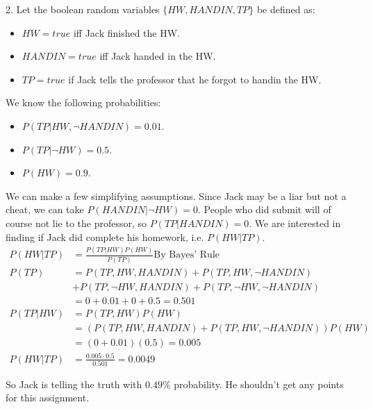 \documentclass[11pt]{article}
\begin{document}
2. Let the boolean random variables $\{HW,HANDIN,TP\}$ be defined as:
		\begin{itemize}
			\item $HW = true$ iff Jack finished the HW.
			\item $HANDIN = true$ iff Jack handed in the HW.
			\item $TP = true$ if Jack tells the professor that he forgot to handin the HW.
		\end{itemize}
	We know the following probabilities:
	\begin{itemize}
		\item $P(TP|HW,\lnot HANDIN) = 0.01$.
		\item $P(TP|\lnot HW) = 0.5$.
		\item $P(HW) = 0.9$.
	\end{itemize}
	We can make a few simplifying assumptions. Since Jack may be a liar but not a cheat,
	we can take $P(HANDIN|\lnot HW) = 0$. People who did submit will of course not
	lie to the professor, so $P(TP|HANDIN) = 0$. We are interested in finding
	if Jack did complete his homework, i.e. $P(HW|TP)$.
	\begin{align*}
		P(HW|TP) &= \frac{P(TP|HW)P(HW)}{P(TP)} \text{By Bayes' Rule} \\
		P(TP) 	 &= P(TP,HW,HANDIN) + P(TP,HW,\lnot HANDIN) \\
						 &	+ P(TP,\lnot HW,HANDIN) + P(TP,\lnot HW,\lnot HANDIN) \\
						 &= 0 + 0.01 + 0 + 0.5 = 0.501 \\
		P(TP|HW) &= P(TP,HW) P(HW) \\
						 &= (P(TP,HW,HANDIN) + P(TP,HW,\lnot HANDIN))P(HW) \\
						 &= (0 + 0.01)(0.5) = 0.005 \\
		P(HW|TP) &= \frac{0.005 \cdot 0.5}{0.501} = \mathbf{0.0049}
	\end{align*}
	
	So Jack is telling the truth with $0.49 \%$ probability. He shouldn't get any points
	for this assignment.
	
\end{document}
